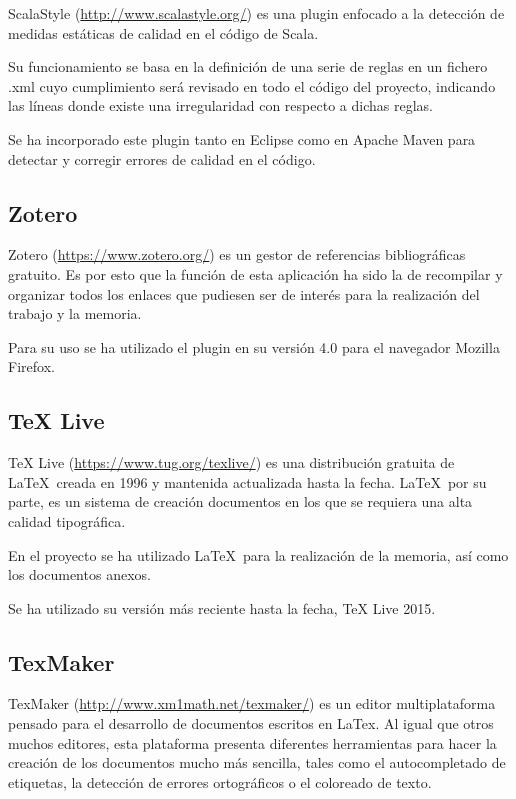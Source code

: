 ScalaStyle (\url{http://www.scalastyle.org/}) es una plugin enfocado a la detección de medidas estáticas de calidad en el código de Scala.

Su funcionamiento se basa en la definición de una serie de reglas en un fichero .xml cuyo cumplimiento será revisado en todo el código del proyecto, indicando las líneas donde existe una irregularidad con respecto a dichas reglas.

Se ha incorporado este plugin tanto en Eclipse como en Apache Maven para detectar y corregir errores de calidad en el código.


\subsection{Zotero}
Zotero (\url{https://www.zotero.org/}) es un gestor de referencias bibliográficas gratuito. Es por esto que la función de esta aplicación ha sido la de recompilar y organizar todos los enlaces que pudiesen ser de interés para la realización del trabajo y la memoria.

Para su uso se ha utilizado el plugin en su versión 4.0 para el navegador Mozilla Firefox.

\subsection{TeX Live}
TeX Live (\url{https://www.tug.org/texlive/}) es una distribución gratuita de \LaTeX\ creada en 1996 y mantenida actualizada hasta la fecha. \LaTeX\, por su parte, es un sistema de creación documentos en los que se requiera una alta calidad tipográfica.

En el proyecto se ha utilizado \LaTeX\ para la realización de la memoria, así como los documentos anexos.

Se ha utilizado su versión más reciente hasta la fecha, TeX Live 2015.

\subsection{TexMaker}

TexMaker (\url{http://www.xm1math.net/texmaker/}) es un editor multiplataforma pensado para el desarrollo de documentos escritos en LaTex. Al igual que otros muchos editores, esta plataforma presenta diferentes herramientas para hacer la creación de los documentos mucho más sencilla, tales como el autocompletado de etiquetas, la detección de errores ortográficos o el coloreado de texto.

